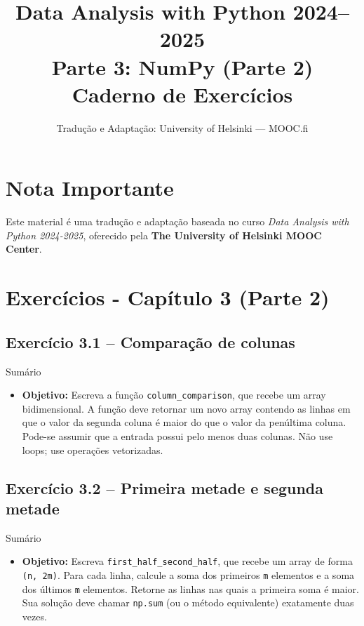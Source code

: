 \documentclass[11pt,a4paper]{article}
\title{\textbf{Data Analysis with Python 2024--2025}\\Parte 3: NumPy (Parte 2)\\\large Caderno de Exercícios}
\author{Tradução e Adaptação: University of Helsinki --- MOOC.fi}
\date{}
\begin{document}
\maketitle

\section*{Nota Importante}
Este material é uma tradução e adaptação baseada no curso \textit{Data Analysis with Python 2024-2025}, oferecido pela \textbf{The University of Helsinki MOOC Center}.

\tableofcontents
\newpage

\section{Exercícios - Capítulo 3 (Parte 2)}

\subsection*{Exercício 3.1 -- Comparação de colunas}
\begin{exercicio}{Sumário}
\begin{itemize}
    \item \textbf{Objetivo:} Escreva a função \texttt{column\_comparison}, que recebe um array bidimensional. A função deve retornar um novo array contendo as linhas em que o valor da segunda coluna é maior do que o valor da penúltima coluna. Pode-se assumir que a entrada possui pelo menos duas colunas. Não use loops; use operações vetorizadas.
\end{itemize}
\end{exercicio}

\subsection*{Exercício 3.2 -- Primeira metade e segunda metade}
\begin{exercicio}{Sumário}
\begin{itemize}
    \item \textbf{Objetivo:} Escreva \texttt{first\_half\_second\_half}, que recebe um array de forma \texttt{(n, 2m)}. Para cada linha, calcule a soma dos primeiros \texttt{m} elementos e a soma dos últimos \texttt{m} elementos. Retorne as linhas nas quais a primeira soma é maior. Sua solução deve chamar \texttt{np.sum} (ou o método equivalente) exatamente duas vezes.
\end{itemize}
\end{exercicio}
\end{document}
